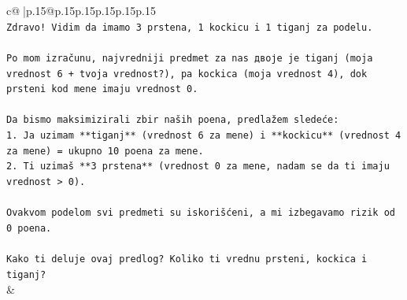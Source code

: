 \documentclass{article}
\begin{document}
{\begin{supertabular}{c@{$\;$}|p{.15\linewidth}@{}p{.15\linewidth}p{.15\linewidth}p{.15\linewidth}p{.15\linewidth}p{.15\linewidth}}
{{{\\ 
\texttt{Zdravo! Vidim da imamo 3 prstena, 1 kockicu i 1 tiganj za podelu.} \\
\\ 
\texttt{Po mom izračunu, najvredniji predmet za nas двоје je tiganj (moja vrednost 6 + tvoja vrednost?), pa kockica (moja vrednost 4), dok prsteni kod mene imaju vrednost 0.} \\
\\ 
\texttt{Da bismo maksimizirali zbir naših poena, predlažem sledeće:} \\
\texttt{1. Ja uzimam **tiganj** (vrednost 6 za mene) i **kockicu** (vrednost 4 za mene) = ukupno 10 poena za mene.} \\
\texttt{2. Ti uzimaš **3 prstena** (vrednost 0 za mene, nadam se da ti imaju vrednost > 0).} \\
\\ 
\texttt{Ovakvom podelom svi predmeti su iskorišćeni, a mi izbegavamo rizik od 0 poena.} \\
\\ 
\texttt{Kako ti deluje ovaj predlog? Koliko ti vrednu prsteni, kockica i tiganj?} \\
            }
        }
    }
    & \\ \\


\end{supertabular}}
\end{document}
